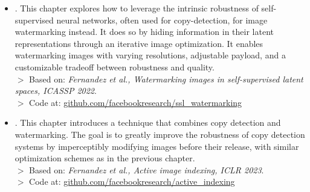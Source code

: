 \newcommand{\basedon}{$>$ Based on: }
\newcommand{\codeat}{$>$ Code at: }
\begin{itemize}
    \item {}.
    This chapter explores how to leverage the intrinsic robustness of self-supervised neural networks, often used for copy-detection, for image watermarking instead.
    It does so by hiding information in their latent representations through an iterative image optimization.
    It enables watermarking images with varying resolutions, adjustable payload, and a customizable tradeoff between robustness and quality.
    \\ \basedon
    \textit{Fernandez et al., Watermarking images in self-supervised latent spaces, ICASSP 2022}.
    \\ \codeat
    \url{github.com/facebookresearch/ssl_watermarking}
    \item {}.
    This chapter introduces a technique that combines copy detection and watermarking.
    The goal is to greatly improve the robustness of copy detection systems by imperceptibly modifying images before their release, with similar optimization schemes as in the previous chapter.
    \\ \basedon
    \textit{Fernandez et al., Active image indexing, ICLR 2023}.
    \\ \codeat
    \url{github.com/facebookresearch/active_indexing}
\end{itemize}

\noindent
{} 

